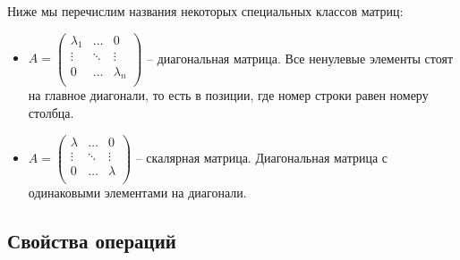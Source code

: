 Ниже мы перечислим названия некоторых специальных классов матриц:
\begin{itemize}
\item 
$A = 
\begin{pmatrix}
{\lambda_1}&{\ldots}&{0}\\
{\vdots}&{\ddots}&{\vdots}\\
{0}&{\ldots}&{\lambda_n}\\
\end{pmatrix}$ -- диагональная матрица. Все ненулевые элементы стоят на главное диагонали, то есть в позиции, где номер строки равен номеру столбца.

\item
$A = 
\begin{pmatrix}
{\lambda}&{\ldots}&{0}\\
{\vdots}&{\ddots}&{\vdots}\\
{0}&{\ldots}&{\lambda}\\
\end{pmatrix}$ -- скалярная матрица. Диагональная матрица с одинаковыми элементами на диагонали.
\end{itemize}

\subsection{Свойства операций}

